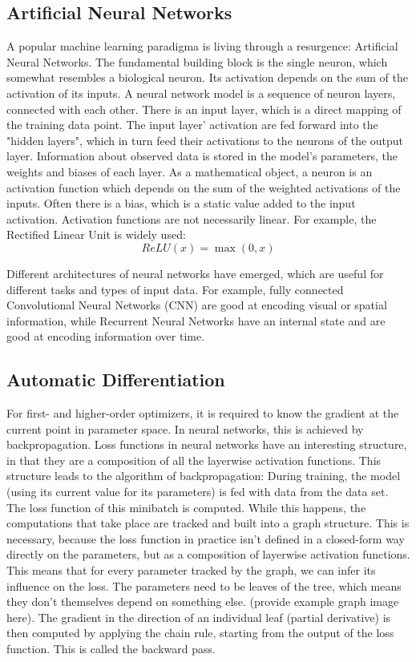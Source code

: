 \documentclass[twoside,12pt,a4paper]{report}
\begin{document}
\subsection{Artificial Neural Networks}
A popular machine learning paradigma is living through a resurgence: Artificial Neural Networks. The fundamental building block is the single neuron, which somewhat resembles a biological neuron. Its activation depends on the sum of the activation of its inputs. A neural network model is a sequence of neuron layers, connected with each other. There is an input layer, which is a direct mapping of the training data point. The input layer' activation are fed forward into the "hidden layers", which in turn feed their activations to the neurons of the output layer. Information about observed data is stored in the model's parameters, the weights and biases of each layer.
As a mathematical object, a neuron is an activation function which depends on the sum of the weighted activations of the inputs. Often there is a bias, which is a static value added to the input activation. Activation functions are not necessarily linear.
For example, the Rectified Linear Unit is widely used:
$$ReLU(x) = \max(0,x) $$

Different architectures of neural networks have emerged, which are useful for different tasks and types of input data. For example, fully connected Convolutional Neural Networks (CNN) are good at encoding visual or spatial information, while Recurrent Neural Networks have an internal state and are good at encoding information over time.


\subsection{Automatic Differentiation}
For first- and higher-order optimizers, it is required to know the gradient at the current point in parameter space. In neural networks, this is achieved by backpropagation.
Loss functions in neural networks have an interesting structure, in that they are a composition of all the layerwise activation functions. This structure leads to the algorithm of backpropagation:
During training, the model (using its current value for its parameters) is fed with data from the data set. The loss function of this minibatch is computed. While this happens, the computations that take place are tracked and built into a graph structure. This is necessary, because the loss function in practice isn't defined in a closed-form way directly on the parameters, but as a composition of layerwise activation functions. This means that for every parameter tracked by the graph, we can infer its influence on the loss. The parameters need to be leaves of the tree, which means they don't themselves depend on something else. (provide example graph image here).
The gradient in the direction of an individual leaf (partial derivative) is then computed by applying the chain rule, starting from the output of the loss function. This is called the backward pass.
\end{document}
